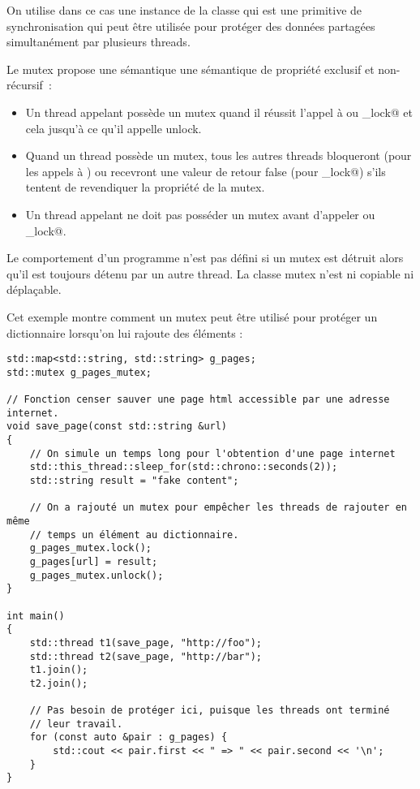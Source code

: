 \documentclass[fleqn,11pt]{article}
\begin{document}
On utilise dans ce cas une instance de la classe \lstinline@mutex@ qui est une primitive de synchronisation qui peut être utilisée pour protéger des données partagées simultanément par plusieurs threads.

Le mutex propose une sémantique une sémantique de propriété exclusif et non-récursif~:

\begin{itemize}
\item Un thread appelant possède un mutex quand il réussit l'appel à 
\lstinline@lock@ ou \lstinline@try_lock@ et cela jusqu'à ce qu'il appelle unlock.
\item Quand un thread possède un mutex, tous les autres threads bloqueront (pour les appels à \lstinline@lock@) ou  recevront une valeur de retour false (pour \lstinline@try_lock@) s'ils tentent de revendiquer la propriété de la mutex.
\item Un thread appelant ne doit pas posséder un mutex avant d'appeler \lstinline@lock@ ou \lstinline@try_lock@.
\end{itemize}

Le comportement d'un programme n'est pas défini si un mutex est détruit alors qu'il est toujours détenu par un autre thread. La classe mutex n'est ni copiable ni déplaçable.

Cet exemple montre comment un mutex peut être utilisé pour protéger un dictionnaire lorsqu'on lui rajoute 
des éléments :

\begin{lstlisting}
std::map<std::string, std::string> g_pages;
std::mutex g_pages_mutex;

// Fonction censer sauver une page html accessible par une adresse internet. 
void save_page(const std::string &url)
{
    // On simule un temps long pour l'obtention d'une page internet
    std::this_thread::sleep_for(std::chrono::seconds(2));
    std::string result = "fake content";
 
    // On a rajouté un mutex pour empêcher les threads de rajouter en même
    // temps un élément au dictionnaire.
    g_pages_mutex.lock();
    g_pages[url] = result;
    g_pages_mutex.unlock();
}
 
int main() 
{
    std::thread t1(save_page, "http://foo");
    std::thread t2(save_page, "http://bar");
    t1.join();
    t2.join();

    // Pas besoin de protéger ici, puisque les threads ont terminé
    // leur travail. 
    for (const auto &pair : g_pages) {
        std::cout << pair.first << " => " << pair.second << '\n';
    }
}
\end{lstlisting}
\end{document}
